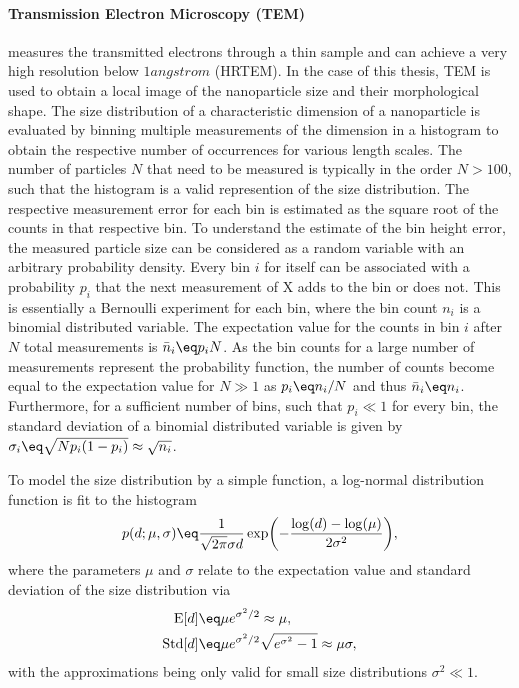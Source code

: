 \documentclass[\main/dresen_thesis.tex]{subfiles}
\begin{document}
    \paragraph{Transmission Electron Microscopy (TEM)}
      measures the transmitted electrons through a thin sample and can achieve a very high resolution below $1 \unit{angstrom}$ (HRTEM).
      In the case of this thesis, TEM is used to obtain a local image of the nanoparticle size and their morphological shape.
      The size distribution of a characteristic dimension of a nanoparticle is evaluated by binning multiple measurements of the dimension in a histogram to obtain the respective number of occurrences for various length scales.
      The number of particles $N$ that need to be measured is typically in the order $N > 100$, such that the histogram is a valid represention of the size distribution.
      The respective measurement error for each bin is estimated as the square root of the counts in that respective bin.
      To understand the estimate of the bin height error, the measured particle size can be considered as a random variable with an arbitrary probability density.
      Every bin $i$ for itself can be associated with a probability $p_i$ that the next measurement of X adds to the bin or does not.
      This is essentially a Bernoulli experiment for each bin, where the bin count $n_i$ is a binomial distributed variable.
      The expectation value for the counts in bin $i$ after $N$ total measurements is $\bar{n}_i \eq p_i N$.
      As the bin counts for a large number of measurements represent the probability function, the number of counts become equal to the expectation value for $N \gg 1$ as $p_i \eq n_i / N$ and thus $\bar{n}_i \eq n_i$.
      Furthermore, for a sufficient number of bins, such that $p_i \ll 1$ for every bin, the standard deviation of a binomial distributed variable is given by $\sigma_i \eq \sqrt{N p_i (1-p_i)} \approx \sqrt{n_i}$.

      To model the size distribution by a simple function, a log-normal distribution function is fit to the histogram
      \begin{align}\label{eq:looselyPackedNP:nanoparticle:lognormalDist}
        p(d; \mu, \sigma) \eq \frac{1}{\sqrt{2\pi} \sigma d} \exp \biggl( - \frac{\log(d) - \log(\mu)}{2 \sigma^2} \biggr),
      \end{align}
      where the parameters $\mu$ and $\sigma$ relate to the expectation value and standard deviation of the size distribution via
      \begin{align}
        \mathrm{E}[d] \eq& \mu e^{\sigma^2/2} \approx \mu,\\
        \mathrm{Std}[d] \eq& \mu e^{\sigma^2/2} \sqrt{e^{\sigma^2} - 1} \approx \mu \sigma,\\
      \end{align}
      with the approximations being only valid for small size distributions $\sigma^2 \ll 1$.
\end{document}
